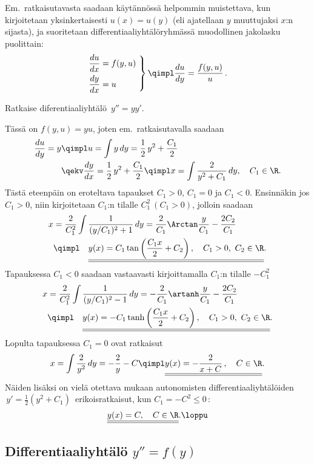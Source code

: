Em.\ ratkaisutavasta saadaan käytännössä helpommin muistettava, kun kirjoitetaan
yksinkertaisesti $u(x)=u(y)$ (eli ajatellaan $y$ muuttujaksi $x$:n sijasta),
ja suoritetaan differentiaaliyhtälöryhmässä muodollinen jakolasku puolittain:
\[ \left. \begin{aligned}
\frac{du}{dx} &= f(y,u)\ \\ \frac{dy}{dx} &= u 
          \end{aligned} \right\} \qimpl \frac{du}{dy} =  \frac{f(y,u)}{u}\,.
\]
\begin{Exa} Ratkaise diferentiaaliyhtälö $\,y''=yy'$. \end{Exa}
\ratk Tässä on $f(y,u)=yu$, joten em.\ ratkaisutavalla saadaan
\begin{align*}
\frac{du}{dy}= y &\qimpl u=\int y\,dy=\frac{1}{2}\,y^2+\frac{C_1}{2} \\
                 &\qekv \frac{dy}{dx}=\frac{1}{2}\,y^2+\frac{C_1}{2}
                  \qimpl x= \int \frac{2}{y^2+C_1}\,dy, \quad C_1\in\R.
\end{align*}
Tästä eteenpäin on eroteltava tapaukset $C_1>0$, $C_1=0$ ja $C_1<0$. Ensinnäkin jos $C_1>0$,
niin kirjoitetaan $C_1$:n tilalle $C_1^2\ (C_1>0)$, jolloin saadaan
\begin{align*}
x &= \frac{2}{C_1^2}\int\frac{1}{(y/C_1)^2+1}\,dy
   = \frac{2}{C_1}\Arctan\frac{y}{C_1}-\frac{2C_2}{C_1} \\
  &\qimpl\quad \underline{\underline{y(x)
                  =C_1\tan\left(\frac{C_1 x}{2}+C_2\right), \quad C_1>0,\ C_2\in\R}}.
\end{align*}
Tapauksessa $C_1<0$ saadaan vastaavasti kirjoittamalla $C_1$:n tilalle $-C_1^2$
\begin{align*}
x &= \frac{2}{C_1^2}\int\frac{1}{(y/C_1)^2-1}\,dy
   = -\frac{2}{C_1}\artanh\frac{y}{C_1}-\frac{2C_2}{C_1} \\
  &\qimpl\quad \underline{\underline{y(x)
                  =-C_1\tanh\left(\frac{C_1 x}{2}+C_2\right), \quad C_1>0,\ C_2\in\R}}.
\end{align*}
Lopulta tapauksessa $C_1=0$ ovat ratkaisut
\[
x = \int \frac{2}{y^2}\,dy = -\frac{2}{y}-C \qimpl \underline{\underline{y(x)
                           = -\frac{2}{x+C}\,, \quad C\in\R}}.
\]
Näiden lisäksi on vielä otettava mukaan autonomisten differentiaaliyhtälöiden
$\,y'=\tfrac{1}{2}(y^2+C_1)\,$ erikoisratkaisut, kun $C_1=-C^2 \le 0\,$:
\[
\underline{\underline{y(x)=C, \quad C\in\R}}. \loppu
\]

\subsection*{Differentiaaliyhtälö $y''=f(y)$}

